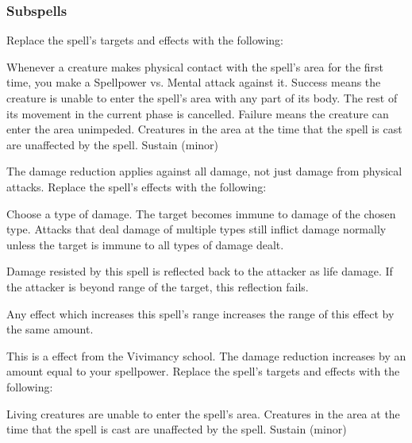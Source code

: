 \subsubsection{Subspells}
Replace the spell's targets and effects with the following:
\begin{spellcontent}
\begin{augmenttargetinginfo}
\end{augmenttargetinginfo}
\begin{augmenteffects}
\spelleffect
Whenever a creature makes physical contact with the spell's area for the first time, you make a Spellpower vs. Mental attack against it.
Success means the creature is unable to enter the spell's area with any part of its body.
The rest of its movement in the current phase is cancelled.
Failure means the creature can enter the area unimpeded.
Creatures in the area at the time that the spell is cast are unaffected by the spell.
\spelldur Sustain (minor)
\end{augmenteffects}
\end{spellcontent}
The damage reduction applies against all damage, not just damage from physical attacks.
Replace the spell's effects with the following:
\begin{spellcontent}
\begin{augmenteffects}
\spelleffect
Choose a type of damage.
The target becomes immune to damage of the chosen type.
Attacks that deal damage of multiple types still inflict damage normally unless the target is immune to all types of damage dealt.
\end{augmenteffects}
\end{spellcontent}
Damage resisted by this spell is reflected back to the attacker as life damage.
If the attacker is beyond \rngclose range of the target, this reflection fails.
\par Any effect which increases this spell's range increases the range of this effect by the same amount.
\par
This is a  effect from the Vivimancy school.
The damage reduction increases by an amount equal to your spellpower.
Replace the spell's targets and effects with the following:
\begin{spellcontent}
\begin{augmenttargetinginfo}
\end{augmenttargetinginfo}
\begin{augmenteffects}
\spelleffect
Living creatures are unable to enter the spell's area.
Creatures in the area at the time that the spell is cast are unaffected by the spell.
\spelldur Sustain (minor)
\end{augmenteffects}
\end{spellcontent}
